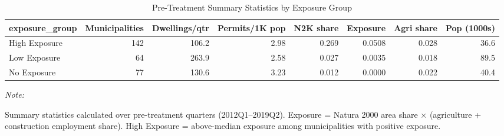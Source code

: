 \begin{table}[!h]
\centering
\caption{\label{tab:tab:sumstats}Pre-Treatment Summary Statistics by Exposure Group}
\centering
\setlength{\tabcolsep}{3pt}
\scriptsize
\begin{threeparttable}
\begin{tabular}[t]{lrrrrrrr}
\toprule
exposure\_group & Municipalities & Dwellings/qtr & Permits/1K pop & N2K share & Exposure & Agri share & Pop (1000s)\\
\midrule
High Exposure & 142 & 106.2 & 2.98 & 0.269 & 0.0508 & 0.028 & 36.6\\
Low Exposure & 64 & 263.9 & 2.58 & 0.027 & 0.0035 & 0.018 & 89.5\\
No Exposure & 77 & 130.6 & 3.23 & 0.012 & 0.0000 & 0.022 & 40.4\\
\bottomrule
\end{tabular}
\begin{tablenotes}
\item \textit{Note: } 
\item Summary statistics calculated over pre-treatment quarters (2012Q1--2019Q2). Exposure = Natura 2000 area share $\times$ (agriculture + construction employment share). High Exposure = above-median exposure among municipalities with positive exposure.
\end{tablenotes}
\end{threeparttable}
\end{table}
